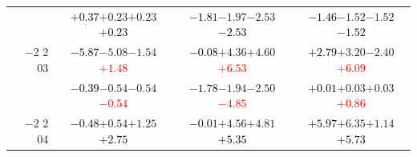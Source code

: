 \documentclass[compress]{beamer}
\begin{document}
\begin{frame}
\begin{tabular}{r | c | c | c}
          & \textcolor{black}{$+0.37$}\hspace{0.1 cm}$+0.23$\hspace{0.1 cm}$+0.23$\hspace{0.1 cm}\textcolor{black}{$+0.23$} & \textcolor{black}{$-1.81$}\hspace{0.1 cm}$-1.97$\hspace{0.1 cm}$-2.53$\hspace{0.1 cm}\textcolor{black}{$-2.53$} & \textcolor{black}{$-1.46$}\hspace{0.1 cm}$-1.52$\hspace{0.1 cm}$-1.52$\hspace{0.1 cm}\textcolor{black}{$-1.52$} \\
$-$2 2 03 & \textcolor{black}{$-5.87$}\hspace{0.1 cm}$-5.08$\hspace{0.1 cm}$-1.54$\hspace{0.1 cm}\textcolor{red}{$+1.48$} & \textcolor{black}{$-0.08$}\hspace{0.1 cm}$+4.36$\hspace{0.1 cm}$+4.60$\hspace{0.1 cm}\textcolor{red}{$+6.53$} & \textcolor{black}{$+2.79$}\hspace{0.1 cm}$+3.20$\hspace{0.1 cm}$-2.40$\hspace{0.1 cm}\textcolor{red}{$+6.09$} \\
          & \textcolor{black}{$-0.39$}\hspace{0.1 cm}$-0.54$\hspace{0.1 cm}$-0.54$\hspace{0.1 cm}\textcolor{red}{$-0.54$} & \textcolor{black}{$-1.78$}\hspace{0.1 cm}$-1.94$\hspace{0.1 cm}$-2.50$\hspace{0.1 cm}\textcolor{red}{$-4.85$} & \textcolor{black}{$+0.01$}\hspace{0.1 cm}$+0.03$\hspace{0.1 cm}$+0.03$\hspace{0.1 cm}\textcolor{red}{$+0.86$} \\
$-$2 2 04 & \textcolor{black}{$-0.48$}\hspace{0.1 cm}$+0.54$\hspace{0.1 cm}$+1.25$\hspace{0.1 cm}\textcolor{black}{$+2.75$} & \textcolor{black}{$-0.01$}\hspace{0.1 cm}$+4.56$\hspace{0.1 cm}$+4.81$\hspace{0.1 cm}\textcolor{black}{$+5.35$} & \textcolor{black}{$+5.97$}\hspace{0.1 cm}$+6.35$\hspace{0.1 cm}$+1.14$\hspace{0.1 cm}\textcolor{black}{$+5.73$} \\

\end{tabular}
\end{frame}
\end{document}
